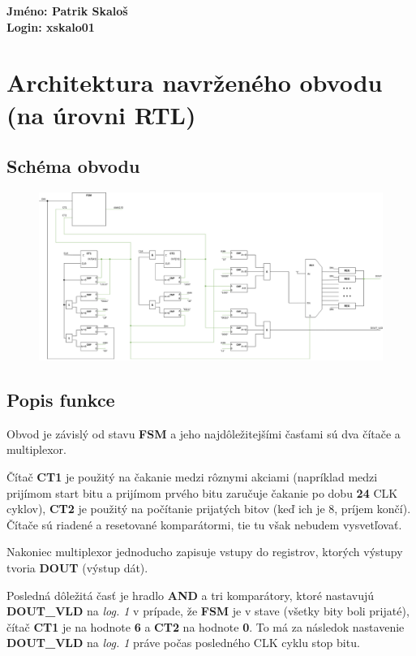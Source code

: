 \documentclass{article}
\begin{document}
\Large
\textbf{Jméno: Patrik Skaloš} \\
\textbf{Login: xskalo01}
\normalsize
\bigskip


\section*{Architektura navrženého obvodu (na úrovni RTL)}
\bigskip

\subsection*{Schéma obvodu}
\bigskip
\begin{figure}[h]
  \begin{center}
    \includegraphics[width=18cm]{src/rtl.eps}
  \end{center}
\end{figure}

\subsection*{Popis funkce}
\bigskip
Obvod je závislý od stavu \textbf{FSM} a jeho najdôležitejšími časťami sú dva 
čítače a multiplexor.
\par
Čítač \textbf{CT1} je použitý na čakanie medzi rôznymi akciami (napríklad
medzi prijímom start bitu a prijímom prvého bitu zaručuje čakanie po dobu
\textbf{24} CLK cyklov), \textbf{CT2} je použitý na počítanie prijatých bitov 
(keď ich je 8, príjem končí). Čítače sú riadené a resetované komparátormi, tie 
tu však nebudem vysvetľovať.
\par
Nakoniec multiplexor jednoducho zapisuje vstupy do registrov, ktorých výstupy 
tvoria \textbf{DOUT} (výstup dát).
\par
Posledná dôležitá časť je hradlo \textbf{AND} a tri komparátory, ktoré 
nastavujú \textbf{DOUT\_VLD} na \emph{log. 1} v prípade, že \textbf{FSM} je v 
stave  (všetky bity boli prijaté), čítač \textbf{CT1} je na 
hodnote \textbf{6} a \textbf{CT2} na hodnote \textbf{0}. To má za následok 
nastavenie \textbf{DOUT\_VLD} na \emph{log. 1} práve počas posledného CLK cyklu 
stop bitu.
\end{document}
